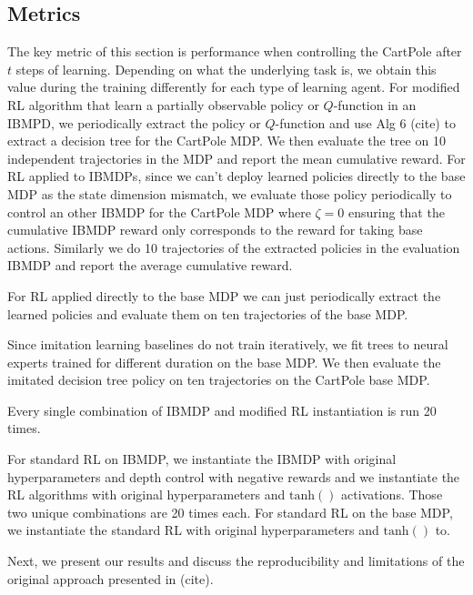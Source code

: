 \subsection{Metrics}

The key metric of this section is performance when controlling the CartPole after $t$ steps of learning.
Depending on what the underlying task is, we obtain this value during the training differently for each type of learning agent.
For modified RL algorithm that learn a partially observable policy or $Q$-function in an IBMPD, we periodically extract the policy or $Q$-function and use Alg 6 (cite) to extract a decision tree for the CartPole MDP. We then evaluate the tree on 10 independent trajectories in the MDP and report the mean cumulative reward.
For RL applied to IBMDPs, since we can't deploy learned policies directly to the base MDP as the state dimension mismatch, we evaluate those policy periodically to control an other IBMDP for the CartPole MDP where $\zeta=0$ ensuring that the cumulative IBMDP reward only corresponds to the reward for taking base actions.
Similarly we do 10 trajectories of the extracted policies in the evaluation IBMDP and report the average cumulative reward.

For RL applied directly to the base MDP we can just periodically extract the learned policies and evaluate them on ten trajectories of the base MDP.

Since imitation learning baselines do not train iteratively, we fit trees to neural experts trained for different duration on the base MDP. 
We then evaluate the imitated decision tree policy on ten trajectories on the CartPole base MDP.

Every single combination of IBMDP and modified RL instantiation is run 20 times.

For standard RL on IBMDP, we instantiate the IBMDP with original hyperparameters and depth control with negative rewards and we instantiate the RL algorithms with original hyperparameters and $\operatorname{tanh()}$ activations. Those two unique combinations are 20 times each.
For standard RL on the base MDP, we instantiate the standard RL with original hyperparameters and $\operatorname{tanh()}$ to.

Next, we present our results and discuss the reproducibility and limitations of the original approach presented in (cite).

